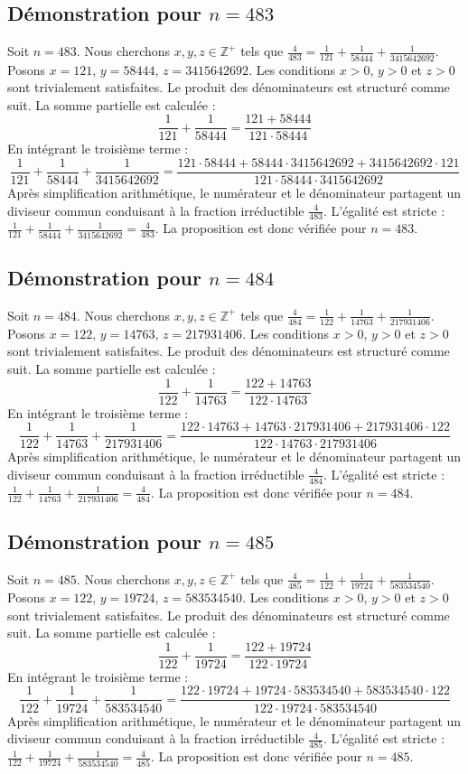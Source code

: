 \documentclass[11pt,a4paper]{article}
\begin{document}
\subsection{Démonstration pour $n = 483$}
Soit $n = 483$. Nous cherchons $x, y, z \in \mathbb{Z}^{+}$ tels que $\frac{4}{483} = \frac{1}{121} + \frac{1}{58444} + \frac{1}{3415642692}$.
Posons $x = 121$, $y = 58444$, $z = 3415642692$.
Les conditions $x > 0$, $y > 0$ et $z > 0$ sont trivialement satisfaites.
Le produit des dénominateurs est structuré comme suit. La somme partielle est calculée :
$$ \frac{1}{121} + \frac{1}{58444} = \frac{121+58444}{121 \cdot 58444} $$
En intégrant le troisième terme :
$$ \frac{1}{121} + \frac{1}{58444} + \frac{1}{3415642692} = \frac{121 \cdot 58444 + 58444 \cdot 3415642692 + 3415642692 \cdot 121}{121 \cdot 58444 \cdot 3415642692} $$
Après simplification arithmétique, le numérateur et le dénominateur partagent un diviseur commun conduisant à la fraction irréductible $\frac{4}{483}$.
L'égalité est stricte : $\frac{1}{121} + \frac{1}{58444} + \frac{1}{3415642692} = \frac{4}{483}$.
La proposition est donc vérifiée pour $n = 483$.
\subsection{Démonstration pour $n = 484$}
Soit $n = 484$. Nous cherchons $x, y, z \in \mathbb{Z}^{+}$ tels que $\frac{4}{484} = \frac{1}{122} + \frac{1}{14763} + \frac{1}{217931406}$.
Posons $x = 122$, $y = 14763$, $z = 217931406$.
Les conditions $x > 0$, $y > 0$ et $z > 0$ sont trivialement satisfaites.
Le produit des dénominateurs est structuré comme suit. La somme partielle est calculée :
$$ \frac{1}{122} + \frac{1}{14763} = \frac{122+14763}{122 \cdot 14763} $$
En intégrant le troisième terme :
$$ \frac{1}{122} + \frac{1}{14763} + \frac{1}{217931406} = \frac{122 \cdot 14763 + 14763 \cdot 217931406 + 217931406 \cdot 122}{122 \cdot 14763 \cdot 217931406} $$
Après simplification arithmétique, le numérateur et le dénominateur partagent un diviseur commun conduisant à la fraction irréductible $\frac{4}{484}$.
L'égalité est stricte : $\frac{1}{122} + \frac{1}{14763} + \frac{1}{217931406} = \frac{4}{484}$.
La proposition est donc vérifiée pour $n = 484$.
\subsection{Démonstration pour $n = 485$}
Soit $n = 485$. Nous cherchons $x, y, z \in \mathbb{Z}^{+}$ tels que $\frac{4}{485} = \frac{1}{122} + \frac{1}{19724} + \frac{1}{583534540}$.
Posons $x = 122$, $y = 19724$, $z = 583534540$.
Les conditions $x > 0$, $y > 0$ et $z > 0$ sont trivialement satisfaites.
Le produit des dénominateurs est structuré comme suit. La somme partielle est calculée :
$$ \frac{1}{122} + \frac{1}{19724} = \frac{122+19724}{122 \cdot 19724} $$
En intégrant le troisième terme :
$$ \frac{1}{122} + \frac{1}{19724} + \frac{1}{583534540} = \frac{122 \cdot 19724 + 19724 \cdot 583534540 + 583534540 \cdot 122}{122 \cdot 19724 \cdot 583534540} $$
Après simplification arithmétique, le numérateur et le dénominateur partagent un diviseur commun conduisant à la fraction irréductible $\frac{4}{485}$.
L'égalité est stricte : $\frac{1}{122} + \frac{1}{19724} + \frac{1}{583534540} = \frac{4}{485}$.
La proposition est donc vérifiée pour $n = 485$.
\end{document}
